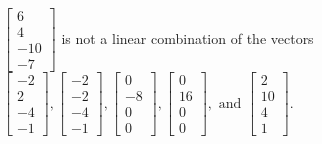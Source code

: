\begin{exercise}
\begin{exerciseStatement}
  \end{exerciseStatement}
  \begin{exerciseAnswer}
   \(\left[\begin{array}{c}
6 \\
4 \\
-10 \\
-7
\end{array}\right]\) 
  	 is not  
	a linear combination of the vectors \(\left[\begin{array}{c}
-2 \\
2 \\
-4 \\
-1
\end{array}\right] , \left[\begin{array}{c}
-2 \\
-2 \\
-4 \\
-1
\end{array}\right] , \left[\begin{array}{c}
0 \\
-8 \\
0 \\
0
\end{array}\right] , \left[\begin{array}{c}
0 \\
16 \\
0 \\
0
\end{array}\right] , \text{ and } \left[\begin{array}{c}
2 \\
10 \\
4 \\
1
\end{array}\right]\).

	
  


  \end{exerciseAnswer}
\end{exercise}